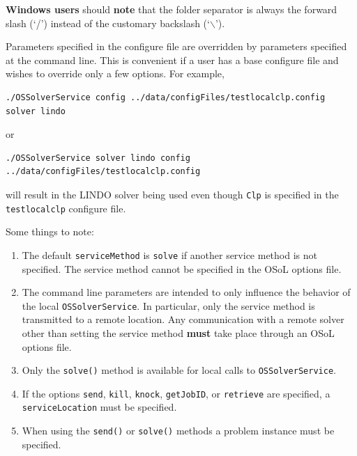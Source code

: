 {\bf Windows users} should {\bf note} that the folder separator is always 
the forward slash (`/') instead of the customary backslash (`$\backslash$').


Parameters specified in the configure file are overridden by parameters specified at the command line.
This is convenient if a user has a base configure file and wishes to override only a few options. For example,
\begin{verbatim}
./OSSolverService config ../data/configFiles/testlocalclp.config solver lindo
\end{verbatim}
or
\begin{verbatim}
./OSSolverService solver lindo config ../data/configFiles/testlocalclp.config
\end{verbatim}
will result in the LINDO solver being used even though {\tt Clp} is specified in the
{\tt testlocalclp} configure file.

Some things to note:

\begin{enumerate}
\item{}  The default {\tt serviceMethod} is {\tt solve} if another service method is not specified.
The service method cannot be specified in the OSoL options file.

\item{} The command line parameters are intended to only influence the behavior of the local {\tt OSSolverService}. 
In particular, only the service method is transmitted to a remote location. Any communication with a remote solver other than setting the service method {\bf must} take place through an OSoL options file.
   
\item{}  Only the {\tt solve()} method is available for local calls
to {\tt OSSolverService}.

\item{}  If the options {\tt send}, {\tt kill},
{\tt knock},  {\tt getJobID},
or {\tt retrieve} are specified,
a  {\tt serviceLocation} must be specified.

\item{}  When using the {\tt send()} or  {\tt solve()} methods
a problem instance must be specified.

\end{enumerate}


